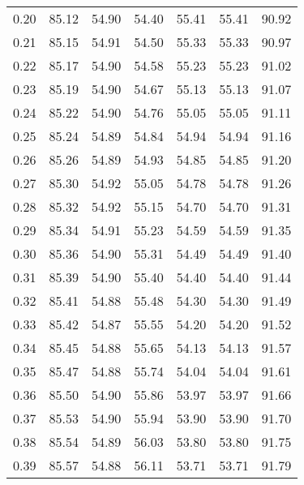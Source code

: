 \begin{tabular}{|c|c|c|c|c|c|c|}
      0.20 &     85.12 &     54.90 &      54.40 &   55.41 &      55.41 &         90.92 \\
      0.21 &     85.15 &     54.91 &      54.50 &   55.33 &      55.33 &         90.97 \\
      0.22 &     85.17 &     54.90 &      54.58 &   55.23 &      55.23 &         91.02 \\
      0.23 &     85.19 &     54.90 &      54.67 &   55.13 &      55.13 &         91.07 \\
      0.24 &     85.22 &     54.90 &      54.76 &   55.05 &      55.05 &         91.11 \\
      0.25 &     85.24 &     54.89 &      54.84 &   54.94 &      54.94 &         91.16 \\
      0.26 &     85.26 &     54.89 &      54.93 &   54.85 &      54.85 &         91.20 \\
      0.27 &     85.30 &     54.92 &      55.05 &   54.78 &      54.78 &         91.26 \\
      0.28 &     85.32 &     54.92 &      55.15 &   54.70 &      54.70 &         91.31 \\
      0.29 &     85.34 &     54.91 &      55.23 &   54.59 &      54.59 &         91.35 \\
      0.30 &     85.36 &     54.90 &      55.31 &   54.49 &      54.49 &         91.40 \\
      0.31 &     85.39 &     54.90 &      55.40 &   54.40 &      54.40 &         91.44 \\
      0.32 &     85.41 &     54.88 &      55.48 &   54.30 &      54.30 &         91.49 \\
      0.33 &     85.42 &     54.87 &      55.55 &   54.20 &      54.20 &         91.52 \\
      0.34 &     85.45 &     54.88 &      55.65 &   54.13 &      54.13 &         91.57 \\
      0.35 &     85.47 &     54.88 &      55.74 &   54.04 &      54.04 &         91.61 \\
      0.36 &     85.50 &     54.90 &      55.86 &   53.97 &      53.97 &         91.66 \\
      0.37 &     85.53 &     54.90 &      55.94 &   53.90 &      53.90 &         91.70 \\
      0.38 &     85.54 &     54.89 &      56.03 &   53.80 &      53.80 &         91.75 \\
      0.39 &     85.57 &     54.88 &      56.11 &   53.71 &      53.71 &         91.79 \\

\end{tabular}
